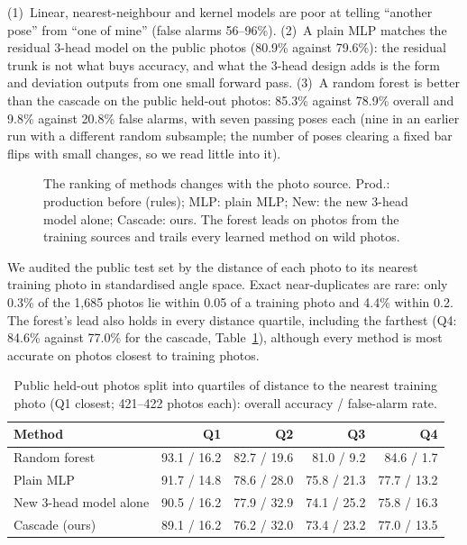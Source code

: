  (1)~Linear, nearest-neighbour and kernel models are poor at telling ``another pose'' from ``one of mine'' (false alarms 56--96\%). (2)~A plain MLP matches the residual 3-head model on the public photos (80.9\% against 79.6\%): the residual trunk is not what buys accuracy, and what the 3-head design adds is the form and deviation outputs from one small forward pass. (3)~A random forest is better than the cascade on the public held-out photos: 85.3\% against 78.9\% overall and 9.8\% against 20.8\% false alarms, with seven passing poses each (nine in an earlier run with a different random subsample; the number of poses clearing a fixed bar flips with small changes, so we read little into it).

\begin{figure}[t]
\centering

\caption{The ranking of methods changes with the photo source. Prod.: production before (rules); MLP: plain MLP; New: the new 3-head model alone; Cascade: ours. The forest leads on photos from the training sources and trails every learned method on wild photos.}
\label{fig:baseline}
\end{figure}
 We audited the public test set by the distance of each photo to its nearest training photo in standardised angle space. Exact near-duplicates are rare: only 0.3\% of the 1{,}685 photos lie within 0.05 of a training photo and 4.4\% within 0.2. The forest's lead also holds in every distance quartile, including the farthest (Q4: 84.6\% against 77.0\% for the cascade, Table~\ref{tab:audit}), although every method is most accurate on photos closest to training photos.
\begin{table}[t]
\centering\footnotesize\setlength{\tabcolsep}{3.5pt}
\caption{Public held-out photos split into quartiles of distance to the nearest training photo (Q1 closest; 421--422 photos each): overall accuracy / false-alarm rate.}\label{tab:audit}
\begin{tabular}{@{}lrrrr@{}}
\toprule
Method & Q1 & Q2 & Q3 & Q4 \\ \midrule
Random forest & 93.1 / 16.2 & 82.7 / 19.6 & 81.0 / 9.2 & 84.6 / 1.7 \\
Plain MLP & 91.7 / 14.8 & 78.6 / 28.0 & 75.8 / 21.3 & 77.7 / 13.2 \\
New 3-head model alone & 90.5 / 16.2 & 77.9 / 32.9 & 74.1 / 25.2 & 75.8 / 16.3 \\
Cascade (ours) & 89.1 / 16.2 & 76.2 / 32.0 & 73.4 / 23.2 & 77.0 / 13.5 \\ \bottomrule
\end{tabular}
\end{table}
